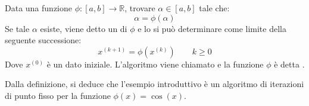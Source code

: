 \begin{definitionbox}
    Data una funzione $\phi: \left[a, b\right] \rightarrow \mathbb{R}$, trovare $\alpha \in \left[a,b\right]$ tale che:
    \begin{equation*}
        \alpha = \phi\left(\alpha\right)
    \end{equation*}
    Se tale $\alpha$ esiste, viene detto un  di $\phi$ e lo si può determinare come limite della seguente successione:
    \begin{equation}
        x^{\left(k+1\right)} = \phi\left(x^{\left(k\right)}\right) \hspace{2em} k \ge 0
    \end{equation}
    Dove $x^{\left(0\right)}$ è un dato iniziale. L'algoritmo viene chiamato  e la funzione $\phi$ è detta .
\end{definitionbox}

\noindent
Dalla definizione, si deduce che l'esempio introduttivo è un algoritmo di iterazioni di punto fisso per la funzione $\phi\left(x\right) = \cos\left(x\right)$.

\newpage

